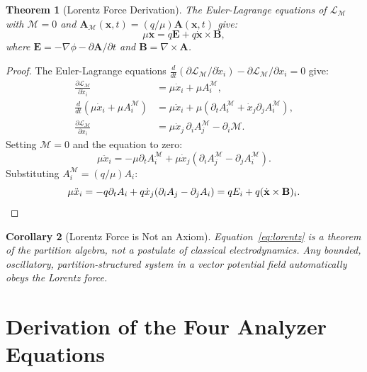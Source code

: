 \documentclass[twocolumn,10pt,a4paper]{article}
\theoremstyle{thmstyle}
\newtheorem{theorem}{Theorem}[section]
\newtheorem{corollary}[theorem]{Corollary}
\theoremstyle{definition}
\theoremstyle{remark}
\newcommand{\LM}{\mathcal{L}_{\mathcal{M}}}
\newcommand{\AM}{\mathbf{A}_{\mathcal{M}}}
\newcommand{\Mop}{\mathcal{M}}
\begin{document}
\begin{theorem}[Lorentz Force Derivation]
\label{thm:lorentz}
The Euler-Lagrange equations of $\LM$ with $\Mop = 0$ and
$\AM(\mathbf{x},t) = (q/\mu)\mathbf{A}(\mathbf{x},t)$ give:
\begin{equation}
\mu\ddot{\mathbf{x}} = q\mathbf{E} + q\dot{\mathbf{x}}\times\mathbf{B},
\label{eq:lorentz}
\end{equation}
where $\mathbf{E} = -\nabla\phi - \partial\mathbf{A}/\partial t$
and $\mathbf{B} = \nabla\times\mathbf{A}$.
\end{theorem}

\begin{proof}
The Euler-Lagrange equations $\tfrac{d}{dt}(\partial\LM/\partial\dot{x}_i)
- \partial\LM/\partial x_i = 0$ give:
\begin{align*}
\frac{\partial\LM}{\partial\dot{x}_i} &= \mu\dot{x}_i + \mu A_i^\mathcal{M},\\
\frac{d}{dt}(\mu\dot{x}_i + \mu A_i^\mathcal{M})
&= \mu\ddot{x}_i + \mu\!\left(\partial_t A_i^\mathcal{M}
+ \dot{x}_j\partial_j A_i^\mathcal{M}\right),\\
\frac{\partial\LM}{\partial x_i}
&= \mu\dot{x}_j\,\partial_i A_j^\mathcal{M} - \partial_i\Mop.
\end{align*}
Setting $\Mop = 0$ and the equation to zero:
\[
\mu\ddot{x}_i = -\mu\partial_t A_i^\mathcal{M}
+ \mu\dot{x}_j(\partial_i A_j^\mathcal{M} - \partial_j A_i^\mathcal{M}).
\]
Substituting $A_i^\mathcal{M} = (q/\mu)A_i$:
\[
\mu\ddot{x}_i = -q\partial_t A_i + q\dot{x}_j(\partial_i A_j - \partial_j A_i)
= qE_i + q(\dot{\mathbf{x}}\times\mathbf{B})_i.
\qedhere
\]
\end{proof}

\begin{corollary}[Lorentz Force is Not an Axiom]
\label{cor:lorentz_derived}
Equation~\eqref{eq:lorentz} is a theorem of the partition algebra, not
a postulate of classical electrodynamics. Any bounded, oscillatory,
partition-structured system in a vector potential field automatically
obeys the Lorentz force.
\end{corollary}

\section{Derivation of the Four Analyzer Equations}
\label{sec:analyzers}
\end{document}
